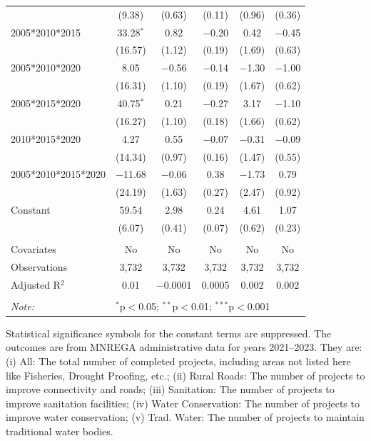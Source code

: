 \begin{table}[!htbp]
\begin{threeparttable}
\begin{tabular}{@{\extracolsep{0pt}}lccccc}
  & (9.38) & (0.63) & (0.11) & (0.96) & (0.36) \\ 
  2005*2010*2015 & 33.28$^{*}$ & 0.82 & $-$0.20 & 0.42 & $-$0.45 \\ 
  & (16.57) & (1.12) & (0.19) & (1.69) & (0.63) \\ 
  2005*2010*2020 & 8.05 & $-$0.56 & $-$0.14 & $-$1.30 & $-$1.00 \\ 
  & (16.31) & (1.10) & (0.19) & (1.67) & (0.62) \\ 
  2005*2015*2020 & 40.75$^{*}$ & 0.21 & $-$0.27 & 3.17 & $-$1.10 \\ 
  & (16.27) & (1.10) & (0.18) & (1.66) & (0.62) \\ 
  2010*2015*2020 & 4.27 & 0.55 & $-$0.07 & $-$0.31 & $-$0.09 \\ 
  & (14.34) & (0.97) & (0.16) & (1.47) & (0.55) \\ 
  2005*2010*2015*2020 & $-$11.68 & $-$0.06 & 0.38 & $-$1.73 & 0.79 \\ 
  & (24.19) & (1.63) & (0.27) & (2.47) & (0.92) \\ 
  Constant & 59.54 & 2.98 & 0.24 & 4.61 & 1.07 \\ 
  & (6.07) & (0.41) & (0.07) & (0.62) & (0.23) \\ 
 \hline \\[-1.8ex] 
Covariates & No & No & No & No & No \\ 
Observations & 3,732 & 3,732 & 3,732 & 3,732 & 3,732 \\ 
Adjusted R$^{2}$ & 0.01 & $-$0.0001 & 0.0005 & 0.002 & 0.002 \\ 
\hline 
\hline \\[-1.8ex] 
\textit{Note:}  & \multicolumn{5}{l}{$^{*}$p$<$0.05; $^{**}$p$<$0.01; $^{***}$p$<$0.001} \\ 
\end{tabular} 
\begin{tablenotes}[flushleft]
\scriptsize
\item[] Statistical significance symbols for the constant terms are suppressed. The outcomes are from MNREGA administrative data for years 2021--2023. They are: 
(i) All: The total number of completed projects, including areas not listed here like Fisheries, Drought Proofing, etc.;
(ii) Rural Roads: The number of projects to improve connectivity and roads;
(iii) Sanitation: The number of projects to improve sanitation facilities;
(iv) Water Conservation: The number of projects to improve water conservation;
(v) Trad. Water: The number of projects to maintain traditional water bodies.
\end{tablenotes}
\end{threeparttable}
\end{table}
